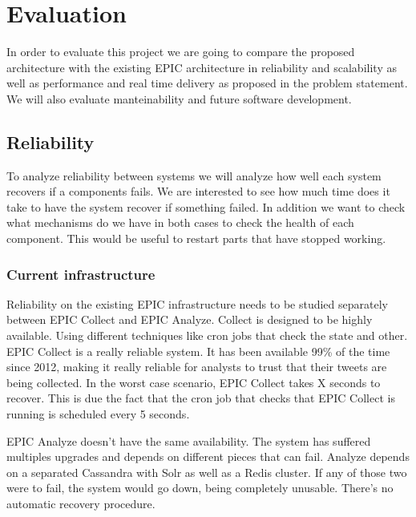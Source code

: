
\chapter{Evaluation} %

\label{Chapter4} %

In order to evaluate this project we are going to compare the proposed architecture with the existing EPIC architecture in reliability and scalability as well as performance and real time delivery as proposed in the problem statement. We will also evaluate manteinability and future software development.

\section{Reliability}

To analyze reliability between systems we will analyze how well each system recovers if a components fails. We are interested to see how much time does it take to have the system recover if something failed. In addition we want to check what mechanisms do we have in both cases to check the health of each component. This would be useful to restart parts that have stopped working. 

\subsection{Current infrastructure}

Reliability on the existing EPIC infrastructure needs to be studied separately between EPIC Collect and EPIC Analyze. Collect is designed to be highly available. Using different techniques like cron jobs  that check the state and other. EPIC Collect is a really reliable system. It has been available 99\% of the time since 2012, making it really reliable for analysts to trust that their tweets are being collected. In the worst case scenario, EPIC Collect takes X seconds to recover. This is due the fact that the cron job that checks that EPIC Collect is running is scheduled every 5 seconds.

EPIC Analyze doesn’t have the same availability. The system has suffered multiples upgrades and depends on different pieces that can fail. Analyze depends on a separated Cassandra with Solr as well as a Redis cluster. If any of those two were to fail, the system would go down, being completely unusable. There’s no automatic recovery procedure. 

